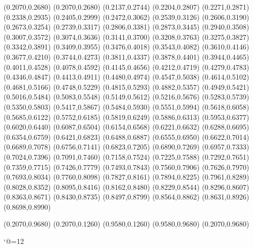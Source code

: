 \PST@Dotted(0.2070,0.2680)
(0.2070,0.2680)
(0.2137,0.2744)
(0.2204,0.2807)
(0.2271,0.2871)
(0.2338,0.2935)
(0.2405,0.2999)
(0.2472,0.3062)
(0.2539,0.3126)
(0.2606,0.3190)
(0.2673,0.3254)
(0.2739,0.3317)
(0.2806,0.3381)
(0.2873,0.3445)
(0.2940,0.3508)
(0.3007,0.3572)
(0.3074,0.3636)
(0.3141,0.3700)
(0.3208,0.3763)
(0.3275,0.3827)
(0.3342,0.3891)
(0.3409,0.3955)
(0.3476,0.4018)
(0.3543,0.4082)
(0.3610,0.4146)
(0.3677,0.4210)
(0.3744,0.4273)
(0.3811,0.4337)
(0.3878,0.4401)
(0.3944,0.4465)
(0.4011,0.4528)
(0.4078,0.4592)
(0.4145,0.4656)
(0.4212,0.4719)
(0.4279,0.4783)
(0.4346,0.4847)
(0.4413,0.4911)
(0.4480,0.4974)
(0.4547,0.5038)
(0.4614,0.5102)
(0.4681,0.5166)
(0.4748,0.5229)
(0.4815,0.5293)
(0.4882,0.5357)
(0.4949,0.5421)
(0.5016,0.5484)
(0.5083,0.5548)
(0.5149,0.5612)
(0.5216,0.5676)
(0.5283,0.5739)
(0.5350,0.5803)
(0.5417,0.5867)
(0.5484,0.5930)
(0.5551,0.5994)
(0.5618,0.6058)
(0.5685,0.6122)
(0.5752,0.6185)
(0.5819,0.6249)
(0.5886,0.6313)
(0.5953,0.6377)
(0.6020,0.6440)
(0.6087,0.6504)
(0.6154,0.6568)
(0.6221,0.6632)
(0.6288,0.6695)
(0.6354,0.6759)
(0.6421,0.6823)
(0.6488,0.6887)
(0.6555,0.6950)
(0.6622,0.7014)
(0.6689,0.7078)
(0.6756,0.7141)
(0.6823,0.7205)
(0.6890,0.7269)
(0.6957,0.7333)
(0.7024,0.7396)
(0.7091,0.7460)
(0.7158,0.7524)
(0.7225,0.7588)
(0.7292,0.7651)
(0.7359,0.7715)
(0.7426,0.7779)
(0.7493,0.7843)
(0.7560,0.7906)
(0.7626,0.7970)
(0.7693,0.8034)
(0.7760,0.8098)
(0.7827,0.8161)
(0.7894,0.8225)
(0.7961,0.8289)
(0.8028,0.8352)
(0.8095,0.8416)
(0.8162,0.8480)
(0.8229,0.8544)
(0.8296,0.8607)
(0.8363,0.8671)
(0.8430,0.8735)
(0.8497,0.8799)
(0.8564,0.8862)
(0.8631,0.8926)
(0.8698,0.8990)

\PST@Border(0.2070,0.9680)
(0.2070,0.1260)
(0.9580,0.1260)
(0.9580,0.9680)
(0.2070,0.9680)

\catcode`@=12
\fi
\endpspicture
